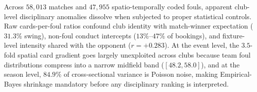 \documentclass[10pt,twocolumn]{article}
\begin{document}
Across $58,013$ matches and $47,955$ spatio-temporally coded fouls, apparent club-level disciplinary anomalies dissolve when subjected to proper statistical controls. Raw cards-per-foul ratios confound club identity with match-winner expectation ($31.3\%$ swing), non-foul conduct intercepts ($13\%\text{--}47\%$ of bookings), and fixture-level intensity shared with the opponent ($r = +0.283$). At the event level, the $3.5$-fold spatial card gradient goes largely unexploited across clubs because team foul distributions compress into a narrow midfield band ($[48.2, 58.0]$), and at the season level, $84.9\%$ of cross-sectional variance is Poisson noise, making Empirical-Bayes shrinkage mandatory before any disciplinary ranking is interpreted.

{\small


}
\end{document}
